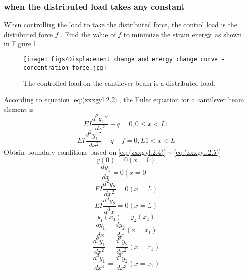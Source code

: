 \subsubsection {when the distributed load takes any constant}
When controlling the load to take the distributed force, the control load is the distributed force $ f $ . Find the value of $ f $ to minimize the strain energy, as shown in Figure \ref{fig:fenbuli}
\begin{figure}[h!] %
    \centering
    \texttt{[image: figs/Displacement change and energy change curve - concentration force.jpg]} 
    \caption{The controlled load on the cantilever beam is a distributed load.}
    \label{fig:fenbuli}
\end{figure}
According to equation \ref{eq:(zxxgyl.2.2)}, the Euler equation for a cantilever beam element is
\begin{equation}\label{eq:(example.xbl.27)}
EI\frac{d^2y_1''}{dx^2}-q=0,0\leq x<L1
\end{equation}
\begin{equation}\label{eq:(example.xbl.28)}
EI\frac{d^2y_1''}{dx^2}-q-f=0,L1< x<L
\end{equation}
Obtain boundary conditions based on \ref{eq:(zxxgyl.2.4)} \~{} \ref{eq:(zxxgyl.2.5)}
\begin{equation}\label{eq:(example.xbl.29)}
y(0)=0 (x=0)
\end{equation}
\begin{equation}\label{eq:(example.xbl.30)}
\frac{d y_1}{dx}=0 (x=0)
\end{equation}
\begin{equation}\label{eq:(example.xbl.31)}
EI\frac{d^2 y_2}{dx^2}=0 (x=L)
\end{equation}
\begin{equation}\label{eq:(example.xbl.32)}
EI\frac{d^3 y_2}{d^3 x}=0 (x=L)
\end{equation}
\begin{equation}\label{eq:(example.xbl.33)}
y_1(x_1)=y_2(x_1)
\end{equation}
\begin{equation}\label{eq:(example.xbl.34)}
\frac{d y_1}{dx}=\frac{d y_2}{dx}(x=x_1)
\end{equation}
\begin{equation}\label{eq:(example.xbl.35)}
\frac{d^2 y_1}{dx^2}=\frac{d^2 y_2}{dx^2}(x=x_1)
\end{equation}
\begin{equation}\label{eq:(example.xbl.36)}
\frac{d^3 y_1}{dx^3}=\frac{d^3 y_2}{dx^3}(x=x_1)
\end{equation}
